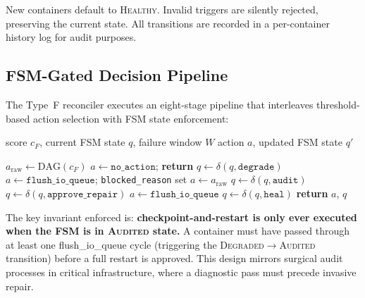 \documentclass[runningheads]{llncs}
\begin{document}
New containers default to \textsc{Healthy}.  Invalid triggers are
silently rejected, preserving the current state.  All transitions are
recorded in a per-container history log for audit purposes.

\subsection{FSM-Gated Decision Pipeline}

The Type~F reconciler executes an eight-stage pipeline that interleaves
threshold-based action selection with FSM state enforcement:

\begin{algorithm}[H]
\caption{Type~F FSM-gated reconciliation for one container}
\label{alg:reconcile_f}
\begin{algorithmic}[1]
\Require score $c_F$, current FSM state $q$, failure window $W$
\Ensure action $a$, updated FSM state $q'$

\State $a_\text{raw} \gets \text{DAG}(c_F)$ 
  \State $a \gets \texttt{no\_action}$; \textbf{return}
\EndIf
{}
  \State $q \gets \delta(q, \texttt{degrade})$
\EndIf
{}
  \State $a \gets \texttt{flush\_io\_queue}$; \texttt{blocked\_reason} set 
\Else
  \State $a \gets a_\text{raw}$
\EndIf
{}
  \State $q \gets \delta(q, \texttt{audit})$
\EndIf
{}
  \State $q \gets \delta(q, \texttt{approve\_repair})$
\EndIf
{}
  \State $a \gets \texttt{flush\_io\_queue}$ 
\EndIf
{}
  \State $q \gets \delta(q, \texttt{heal})$
\EndIf
\State \textbf{return} $a$, $q$
\end{algorithmic}
\end{algorithm}

\noindent The key invariant enforced is:
\textbf{checkpoint-and-restart is only ever executed when the FSM is
in \textsc{Audited} state.}  A container must have passed through at
least one flush\_io\_queue cycle (triggering the \textsc{Degraded}$\to$\textsc{Audited}
transition) before a full restart is approved.  This design mirrors
surgical audit processes in critical infrastructure, where a
diagnostic pass must precede invasive repair.
\end{document}
